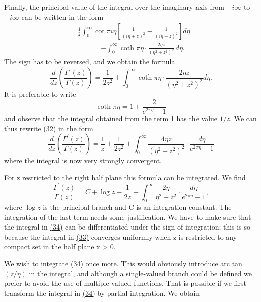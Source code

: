 Finally, the principal value of the integral over the imaginary axis from $-i\infty$ to $+i\infty$ can be written in the form
\begin{equation*}
\begin{aligned}
&\frac12\int_0^\infty\cot\pi i\eta
\left[\frac1{(i\eta+z)^2}-\frac1{(i\eta-z)^2}\right]d\eta\\
&\qquad=-\int_0^\infty\coth\pi\eta\cdot
\frac{2\eta z}{(\eta^2+z^2)^2}\,d\eta.
\end{aligned}
\end{equation*}
The sign has to be reversed, and we obtain the formula
\begin{equation*}
\frac {d}{d z} \left(\frac {\Gamma^ {\prime} (z)}{\Gamma (z)}\right) = \frac {1}{2 z ^ {2}} + \int_ {0} ^ {\infty} \coth \pi \eta \cdot \frac {2 \eta z}{(\eta^ {2} + z ^ {2}) ^ {2}} d \eta .\tag{32}\label{eq:5.32}
\end{equation*}
It is preferable to write
\begin{equation*}
\coth \pi \eta = 1 + \frac {2}{e ^ {2 \pi \eta} - 1}
\end{equation*}
and observe that the integral obtained from the term 1 has the value $1/z$. We can thus rewrite \hyperref[eq:5.32]{(32)} in the form
\begin{equation*}
\frac {d}{d z} \left(\frac {\Gamma^ {\prime} (z)}{\Gamma (z)}\right) = \frac {1}{z} + \frac {1}{2 z ^ {2}} + \int_ {0} ^ {\infty} \frac {4 \eta z}{(\eta^ {2} + z ^ {2}) ^ {2}} \cdot \frac {d \eta}{e ^ {2 \pi \eta} - 1}\tag{33}\label{eq:5.33}
\end{equation*}
where the integral is now very strongly convergent.

For z restricted to the right half plane this formula can be integrated. We find
\begin{equation*}
\frac {\Gamma^ {\prime} (z)}{\Gamma (z)} = C + \log z - \frac {1}{2 z} - \int_ {0} ^ {\infty} \frac {2 \eta}{\eta^ {2} + z ^ {2}} \cdot \frac {d \eta}{e ^ {2 \pi \eta} - 1},\tag{34}\label{eq:5.34}
\end{equation*}
where $\log z$ is the principal branch and C is an integration constant. The integration of the last term needs some justification. We have to make sure that the integral in \hyperref[eq:5.34]{(34)} can be differentiated under the sign of integration; this is so because the integral in \hyperref[eq:5.33]{(33)} converges uniformly when z is restricted to any compact set in the half plane x > 0.

We wish to integrate \hyperref[eq:5.34]{(34)} once more. This would obviously introduce arc tan $(z/\eta)$ in the integral, and although a single-valued branch could be defined we prefer to avoid the use of multiple-valued functions. That is possible if we first transform the integral in \hyperref[eq:5.34]{(34)} by partial integration. We obtain


